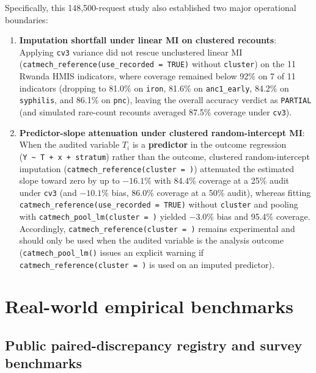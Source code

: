 \documentclass[
]{article}
\providecommand{\tightlist}{%
  \setlength{\itemsep}{0pt}\setlength{\parskip}{0pt}}
\begin{document}
Specifically, this 148,500-request study also established two major
operational boundaries:

\begin{enumerate}
\def\labelenumi{\arabic{enumi}.}
\tightlist
\item
  \textbf{Imputation shortfall under linear MI on clustered recounts}:
  Applying \texttt{cv3} variance did not rescue unclustered linear MI
  (\texttt{catmech\_reference(use\_recorded\ =\ TRUE)} without
  \texttt{cluster}) on the 11 Rwanda HMIS indicators, where coverage
  remained below 92\% on 7 of 11 indicators (dropping to 81.0\% on
  \texttt{iron}, 81.6\% on \texttt{anc1\_early}, 84.2\% on
  \texttt{syphilis}, and 86.1\% on \texttt{pnc}), leaving the overall
  accuracy verdict as \texttt{PARTIAL} (and simulated rare-count
  recounts averaged 87.5\% coverage under \texttt{cv3}).
\item
  \textbf{Predictor-slope attenuation under clustered random-intercept
  MI}: When the audited variable \(T_i\) is a \textbf{predictor} in the
  outcome regression
  (\texttt{Y\ \textasciitilde{}\ T\ +\ x\ +\ stratum}) rather than the
  outcome, clustered random-intercept imputation
  (\texttt{catmech\_reference(cluster\ =\ )}) attenuated the estimated
  slope toward zero by up to \(-16.1\%\) with 84.4\% coverage at a 25\%
  audit under \texttt{cv3} (and \(-10.1\%\) bias, 86.0\% coverage at a
  50\% audit), whereas fitting
  \texttt{catmech\_reference(use\_recorded\ =\ TRUE)} without
  \texttt{cluster} and pooling with
  \texttt{catmech\_pool\_lm(cluster\ =\ )} yielded \(-3.0\%\) bias and
  95.4\% coverage. Accordingly,
  \texttt{catmech\_reference(cluster\ =\ )} remains experimental and
  should only be used when the audited variable is the analysis outcome
  (\texttt{catmech\_pool\_lm()} issues an explicit warning if
  \texttt{catmech\_reference(cluster\ =\ )} is used on an imputed
  predictor).
\end{enumerate}

\section{Real-world empirical
benchmarks}\label{real-world-empirical-benchmarks}

\subsection{Public paired-discrepancy registry and survey
benchmarks}\label{public-paired-discrepancy-registry-and-survey-benchmarks}
\end{document}

